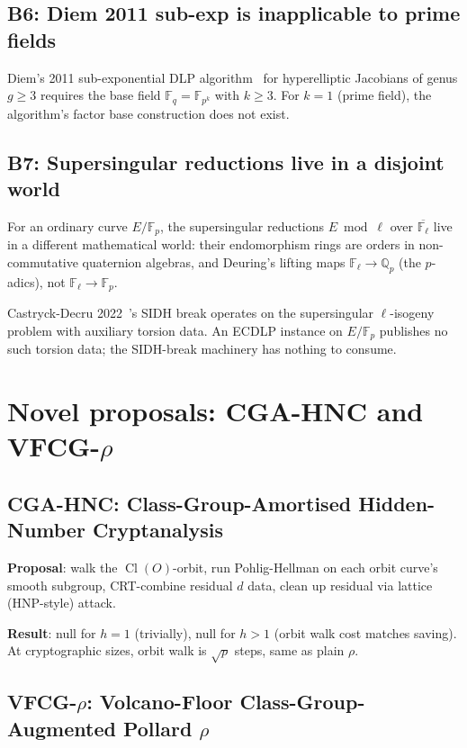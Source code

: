 \documentclass[11pt,a4paper]{article}
\theoremstyle{definition}
\newcommand{\FF}{\mathbb{F}}
\newcommand{\QQ}{\mathbb{Q}}
\newcommand{\Cl}{\operatorname{Cl}}
\begin{document}
\subsection*{B6: Diem 2011 sub-exp is inapplicable to prime fields}

Diem's 2011 sub-exponential DLP algorithm~\cite{diem2011} for
hyperelliptic Jacobians of genus $g \geq 3$ requires the base field
$\FF_q = \FF_{p^k}$ with $k \geq 3$. For $k = 1$ (prime field), the
algorithm's factor base construction does not exist.

\subsection*{B7: Supersingular reductions live in a disjoint world}

For an ordinary curve $E/\FF_p$, the supersingular reductions
$E \bmod \ell$ over $\overline{\FF_\ell}$ live in a different
mathematical world: their endomorphism rings are orders in
non-commutative quaternion algebras, and Deuring's lifting maps
$\FF_\ell \to \QQ_p$ (the $p$-adics), not $\FF_\ell \to \FF_p$.

Castryck-Decru 2022~\cite{castryckdecru2023}'s SIDH break operates
on the supersingular $\ell$-isogeny problem with auxiliary torsion
data. An ECDLP instance on $E/\FF_p$ publishes no such torsion
data; the SIDH-break machinery has nothing to consume.

\section{Novel proposals: CGA-HNC and VFCG-$\rho$}\label{sec:novel}

\subsection{CGA-HNC: Class-Group-Amortised Hidden-Number Cryptanalysis}

\textbf{Proposal}: walk the $\Cl(O)$-orbit, run Pohlig-Hellman on
each orbit curve's smooth subgroup, CRT-combine residual $d$ data,
clean up residual via lattice (HNP-style) attack.

\textbf{Result}: null for $h = 1$ (trivially), null for $h > 1$
(orbit walk cost matches saving). At cryptographic sizes, orbit
walk is $\sqrt{p}$ steps, same as plain $\rho$.

\subsection{VFCG-$\rho$: Volcano-Floor Class-Group-Augmented Pollard $\rho$}
\end{document}
